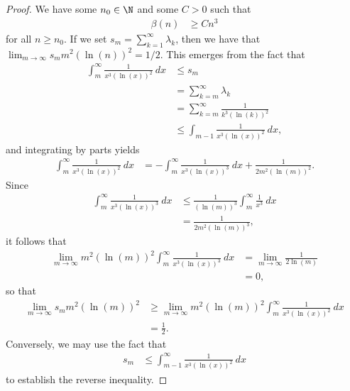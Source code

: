 \documentclass[10pt]{mypackage}
\begin{document}
\begin{proof}
  We have some $n_0\in \N$ and some $C > 0$ such that
  \begin{align*}
    \beta(n) &\geq Cn^3
  \end{align*}
  for all $n\geq n_0$. If we set $s_m = \sum_{k=1}^{\infty}\lambda_k$, then we have that $\lim_{m\to\infty}s_mm^2\left( \ln(n) \right)^2 = 1/2$. This emerges from the fact that
  \begin{align*}
    \int_{m}^{\infty} \frac{1}{x^3\left( \ln(x) \right)^2}\:dx &\leq s_m\\
                                                               &= \sum_{k=m}^{\infty} \lambda_k\\
                                                               &= \sum_{k=m}^{\infty}\frac{1}{k^3\left( \ln(k) \right)^2}\\
                                                               &\leq \int_{m-1}^{} \frac{1}{x^3\left( \ln(x) \right)^2}\:dx,
  \end{align*}
  and integrating by parts yields
  \begin{align*}
    \int_{m}^{\infty} \frac{1}{x^3\left( \ln(x) \right)^2}\:dx &= - \int_{m}^{\infty} \frac{1}{x^3\left( \ln(x) \right)^3}\:dx + \frac{1}{2m^2\left( \ln(m) \right)^2}.
  \end{align*}
  Since
  \begin{align*}
    \int_{m}^{\infty} \frac{1}{x^3\left( \ln(x) \right)^3}\:dx &\leq \frac{1}{\left( \ln(m) \right)^3} \int_{m}^{\infty} \frac{1}{x^3}\:dx\\
                                                               &= \frac{1}{2m^2\left( \ln(m) \right)^3},
  \end{align*}
  it follows that
  \begin{align*}
    \lim_{m\to\infty} m^2\left( \ln(m) \right)^2 \int_{m}^{\infty} \frac{1}{x^3\left( \ln(x) \right)^3}\:dx &= \lim_{m\to\infty} \frac{1}{2\ln(m)}\\
                                                                                                                         &= 0,
  \end{align*}
  so that
  \begin{align*}
    \lim_{m\to\infty} s_mm^2\left( \ln(m) \right)^2 &\geq \lim_{m\to\infty} m^2\left( \ln(m) \right)^2 \int_{m}^{\infty} \frac{1}{x^3\left( \ln(x) \right)^2}\:dx\\
                                                    &= \frac{1}{2}.
  \end{align*}
  Conversely, we may use the fact that
  \begin{align*}
    s_m &\leq \int_{m-1}^{\infty} \frac{1}{x^3\left( \ln(x) \right)^2}\:dx
  \end{align*}
  to establish the reverse inequality.


\end{proof}
\end{document}

